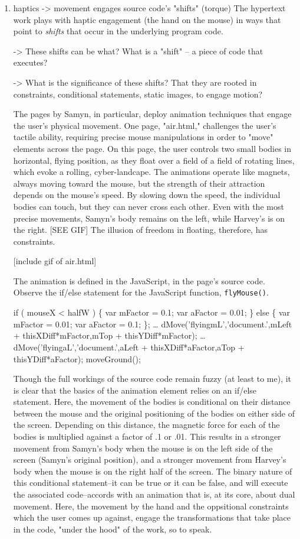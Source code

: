 \documentclass[11pt]{article}
\begin{document}
\begin{enumerate}
\item haptics -> movement engages source code's "shifts" (torque)
\label{sec:orga6cff68}
The hypertext work plays with haptic engagement (the hand on the
mouse) in ways that point to \emph{shifts} that occur in the underlying
program code. 

-> These shifts can be what? What is a "shift" -- a piece of code that
executes?  

-> What is the significance of these shifts? That they are rooted in
constraints, conditional statements, static images, to engage motion?

The pages by Samyn, in particular, deploy animation techniques that
engage the user's physical movement. One page, "air.html," challenges
the user's tactile ability, requiring precise mouse manipulations in
order to "move" elements across the page. On this page, the user
controls two small bodies in horizontal, flying position, as they
float over a field of a field of rotating lines, which evoke a
rolling, cyber-landcape. The animations operate like magnets, always
moving toward the mouse, but the strength of their attraction depends
on the mouse's speed. By slowing down the speed, the individual bodies
can touch, but they can never cross each other. Even with the most
precise movements, Samyn's body remains on the left, while Harvey's is
on the right. [SEE GIF] The illusion of freedom in floating,
therefore, has constraints. 

[include gif of air.html]

The animation is defined in the JavaScript, in the page's source code.
Observe the if/else statement for the JavaScript function,
\texttt{flyMouse()}.

\begin{SOURCE}
if ( mouseX < halfW )
	\{
	var mFactor = 0.1;
	var aFactor = 0.01;
	\}
else
	\{
	var mFactor = 0.01;
	var aFactor = 0.1;
	\};
\ldots{}
dMove('flyingmL','document.',mLeft + thisXDiff*mFactor,mTop + thisYDiff*mFactor);
\ldots{}
dMove('flyingaL','document.',aLeft + thisXDiff*aFactor,aTop + thisYDiff*aFactor);
moveGround();
\end{SOURCE}

Though the full workings of the source code remain fuzzy (at least to
me), it is clear that the basics of the animation element relies on an
if/else statement. Here, the movement of the bodies is conditional on
their distance between the mouse and the original positioning of the
bodies on either side of the screen. Depending on this distance, the
magnetic force for each of the bodies is multiplied against a factor
of .1 or .01. This results in a stronger movement from Samyn's body
when the mouse is on the left side of the screen (Samyn's original
position), and a stronger movement from Harvey's body when the mouse
is on the right half of the screen. The binary nature of this
conditional statement--it can be true or it can be false, and will
execute the associated code--accords with an animation that is, at its
core, about dual movement. Here, the movement by the hand and the
oppsitional constraints which the user comes up against, engage the
transformations that take place in the code, "under the hood" of the
work, so to speak.


\end{enumerate}
\end{document}
